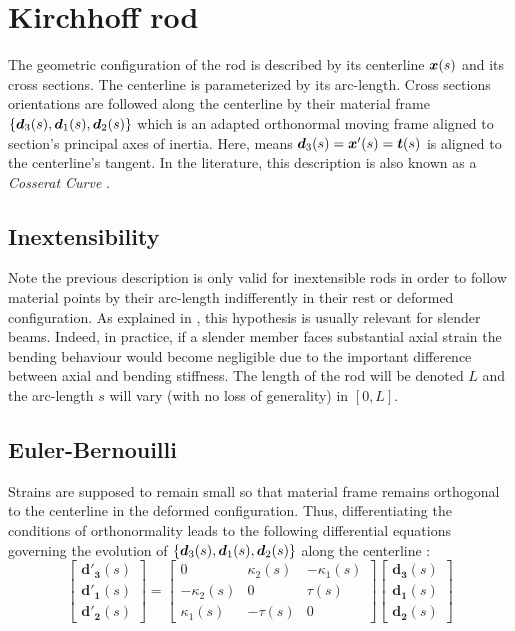 \section{Kirchhoff rod}
The geometric configuration of the rod is described by its centerline $\boldsymbol{x}(s)$ and its cross sections. The centerline is parameterized by its arc-length. Cross sections orientations are followed along the centerline by their material frame $\{\boldsymbol{d}_3 (s),\boldsymbol{d}_1 (s),\boldsymbol{d}_2 (s)\}$ which is an adapted orthonormal moving frame aligned to section's principal axes of inertia. Here,  means $\boldsymbol{d}_3 (s)=\boldsymbol{x}'(s)=\boldsymbol{t}(s)$ is aligned to the centerline's tangent. In the literature, this description is also known as a \emph{Cosserat Curve} \cite{Spillmann2007}.

\subsection{Inextensibility}
Note the previous description is only valid for inextensible rods in order to follow material points by their arc-length indifferently in their rest or deformed configuration. As explained in \cite{Audoly2010}, this hypothesis is usually relevant for slender beams. Indeed, in practice, if a slender member faces substantial axial strain the bending behaviour would become negligible due to the important difference between axial and bending stiffness. The length of the rod will be denoted $L$ and the arc-length $s$ will vary (with no loss of generality) in $[0,L]$.

\subsection{Euler-Bernouilli}
Strains are supposed to remain small so that material frame remains orthogonal to the centerline in the deformed configuration. Thus, differentiating the conditions of orthonormality leads to the following differential equations governing the evolution of $\{\boldsymbol{d}_3 (s),\boldsymbol{d}_1 (s),\boldsymbol{d}_2 (s)\}$ along the centerline :
\begin{equation} \label{eq:3_1}
	\begin{bmatrix}
		\mathbf{d'_{3}}(s) \\
		\mathbf{d'_{1}}(s) \\
		\mathbf{d'_{2}}(s)
	\end{bmatrix}
	=
	\begin{bmatrix}
		0 & \kappa_{2}(s) & -\kappa_{1}(s) \\
		-\kappa_{2}(s) & 0 & \tau(s) \\
		\kappa_{1}(s) & -\tau(s) & 0
	\end{bmatrix}
	\begin{bmatrix}
		\mathbf{d_{3}}(s) \\
		\mathbf{d_{1}}(s) \\
		\mathbf{d_{2}}(s)
	\end{bmatrix}
\end{equation}

